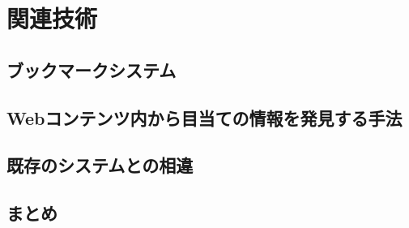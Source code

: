 \chapter{関連技術}
\label{chap:related_works}


\section{ブックマークシステム}

\section{Webコンテンツ内から目当ての情報を発見する手法}
\section{既存のシステムとの相違}
\section{まとめ}
